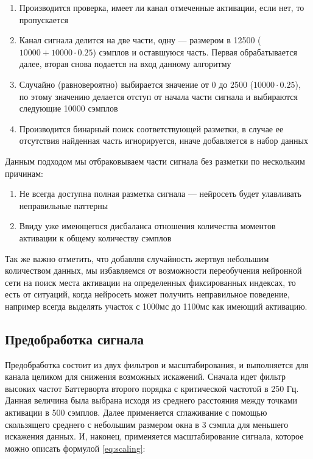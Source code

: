 \begin{enumerate}
	\item Производится проверка, имеет ли канал отмеченные активации, если нет,
	то пропускается

	\item Канал сигнала делится на две части, одну --- размером в 12500 ($10000
		+ 10000 \cdot 0.25$) сэмплов и оставшуюся часть. Первая обрабатывается
	далее, вторая снова подается на вход данному алгоритму

	\item Случайно (равновероятно) выбирается значение от 0 до 2500 ($10000
		\cdot 0.25$), по этому значению делается отступ от начала части сигнала и
	выбираются следующие 10000 сэмплов

	\item Производится бинарный поиск соответствующей разметки, в случае ее
	отсутствия найденная часть игнорируется, иначе добавляется в набор данных

\end{enumerate}

\noindent Данным подходом мы отбраковываем части сигнала без разметки по нескольким причинам:
\begin{enumerate}
	\item Не всегда доступна полная разметка сигнала --- нейросеть будет улавливать
	неправильные паттерны

	\item Ввиду уже имеющегося дисбаланса отношения количества моментов активации к
	общему количеству сэмплов

\end{enumerate}

Так же важно отметить, что добавляя случайность жертвуя небольшим количеством
данных, мы избавляемся от возможности переобучения нейронной сети на поиск
места активации на определенных фиксированных индексах, то есть от ситуаций,
когда нейросеть может получить неправильное поведение, например всегда выделять
участок с 1000мс до 1100мс как имеющий активацию.

\subsection{Предобработка сигнала}

Предобработка состоит из двух фильтров и масштабирования, и выполняется для
канала целиком для снижения возможных искажений. Сначала идет фильтр высоких
частот Баттерворта второго порядка с критической частотой в 250 Гц. Данная
величина была выбрана исходя из среднего расстояния между точками активации в
500 сэмплов. Далее применяется сглаживание с помощью скользящего среднего с
небольшим размером окна в 3 сэмпла для меньшего искажения данных. И, наконец,
применяется масштабирование сигнала, которое можно описать формулой
\ref{eq:scaling}:

